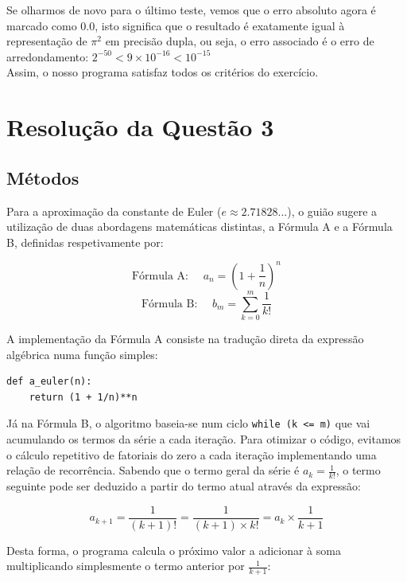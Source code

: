 \documentclass{article}
\begin{document}
\noindent
Se olharmos de novo para o último teste, vemos que o erro absoluto agora
é marcado como $0.0$, isto significa que o resultado é exatamente igual
à representação de $\pi^2$ em precisão dupla, ou seja, o erro associado
é o erro de arredondamento: $2^{-50} < 9 \times 10^{-16} < 10^{-15}$ \\
Assim, o nosso programa satisfaz todos os critérios do exercício.
\pagebreak

\section{Resolução da Questão 3}

\subsection{Métodos}

Para a aproximação da constante de Euler ($e \approx 2.71828...$), o 
guião sugere a utilização de duas abordagens matemáticas distintas, 
a Fórmula A e a Fórmula B, definidas respetivamente por:

\[ \text{Fórmula A: } \quad a_n = \left(1 + \frac{1}{n}\right)^n \]
\[ \text{Fórmula B: } \quad b_m = \sum_{k=0}^{m} \frac{1}{k!} \]

\noindent
A implementação da Fórmula A consiste na tradução direta da expressão 
algébrica numa função simples:

\begin{center}
\begin{minipage}{0.8\linewidth}
\begin{lstlisting}[style=pythoncode]
def a_euler(n):
    return (1 + 1/n)**n
\end{lstlisting}
\end{minipage}
\end{center}

\noindent
Já na Fórmula B, o algoritmo baseia-se num ciclo \texttt{while (k <= m)} 
que vai acumulando os termos da série a cada iteração. Para otimizar o 
código, evitamos o cálculo repetitivo de fatoriais do zero a cada iteração 
implementando uma relação de recorrência. Sabendo que o termo geral da 
série é $a_k = \frac{1}{k!}$, o termo seguinte pode ser deduzido a partir 
do termo atual através da expressão:

\[ a_{k+1} = \frac{1}{(k+1)!} = \frac{1}{(k+1) \times k!} = a_k \times \frac{1}{k+1} \]

\noindent
Desta forma, o programa calcula o próximo valor a adicionar à soma 
multiplicando simplesmente o termo anterior por $\frac{1}{k+1}$:
\end{document}
